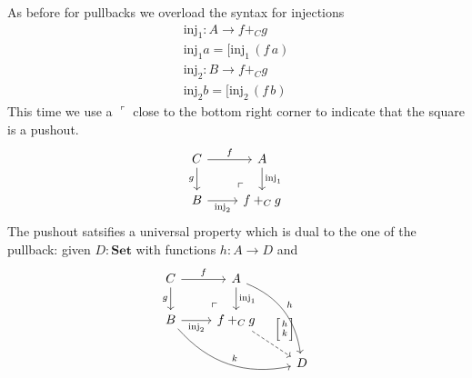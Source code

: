 \documentclass{article}
\newcommand{\Set}{\mathbf{Set}}
\newcommand{\inj}{\mathrm{inj}}
\newcommand{\case}[2]{{\setlength{\arraycolsep}{1pt}
   \renewcommand{\arraystretch}{0.6}\left[\begin{array}{c}#1\\#2\end{array}\right]}}
\begin{document}
As before for pullbacks we overload the syntax for injections
\begin{align*}
\inj_1 : A \to f +_C g  \\
\inj_1 a = [ \inj_1\,(f\,a) \\
\inj_2 : B \to f +_C g  \\
\inj_2 b = [ \inj_2\,(f\,b) 
\end{align*}
This time we use a $\ulcorner$ close to the bottom right corner to indicate that the square is a pushout.
\[\begin{tikzcd}
C \arrow[r,"f"]\arrow[d,"g" left] 
\arrow[dr, phantom, "\ulcorner", very near end]
& A \arrow[d,"\inj_1"]\\
B  \arrow[r,"\inj_2" below] & f +_C g
\end{tikzcd}\]
The pushout satsifies a universal property which is dual to the one of the pullback: given $D : \Set$ with functions $h : A \to D$ and 
\[\begin{tikzcd}
C \arrow[r,"f"]\arrow[d,"g" left] 
\arrow[dr, phantom, "\ulcorner", very near end]
& A \arrow[d,"\inj_1"]  \arrow[rdd,bend left,"h"]\\
B  \arrow[r,"\inj_2" below] \arrow[drr,bend right,"k"] & f +_C g 
\arrow[dr,dashrightarrow,"\case{h}{k}"]\\
& & D
\end{tikzcd}\]

\end{document}
